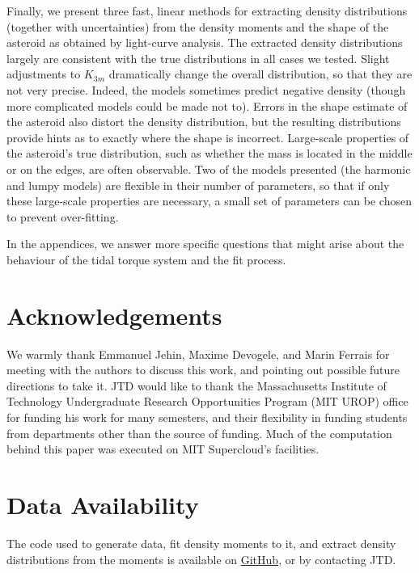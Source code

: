 \documentclass[fleqn,usenatbib]{mnras}
\begin{document}
Finally, we present three fast, linear methods for extracting density distributions (together with uncertainties) from the density moments and the shape of the asteroid as obtained by light-curve analysis. The extracted density distributions largely are consistent with the true distributions in all cases we tested. Slight adjustments to $K_{3m}$ dramatically change the overall distribution, so that they are not very precise. Indeed, the models sometimes predict negative density (though more complicated models could be made not to). Errors in the shape estimate of the asteroid also distort the density distribution, but the resulting distributions provide hints as to exactly where the shape is incorrect. Large-scale properties of the asteroid's true distribution, such as whether the mass is located in the middle or on the edges, are often observable. Two of the models presented (the harmonic and lumpy models) are flexible in their number of parameters, so that if only these large-scale properties are necessary, a small set of parameters can be chosen to prevent over-fitting.

In the appendices, we answer more specific questions that might arise about the behaviour of the tidal torque system and the fit process.

\section*{Acknowledgements}

We warmly thank Emmanuel Jehin, Maxime Devogele, and Marin Ferrais for meeting with the authors to discuss this work, and pointing out possible future directions to take it. JTD would like to thank the Massachusetts Institute of Technology Undergraduate Research Opportunities Program (MIT UROP) office for funding his work for many semesters, and their flexibility in funding students from departments other than the source of funding. Much of the computation behind this paper was executed on MIT Supercloud's facilities.



\section*{Data Availability}

The code used to generate data, fit density moments to it, and extract density distributions from the moments is available on \href{https://github.com/jack-dinsmore/asteroid-tidal-torque}{GitHub}, or by contacting JTD.












\bsp	%
\label{lastpage}
\end{document}

